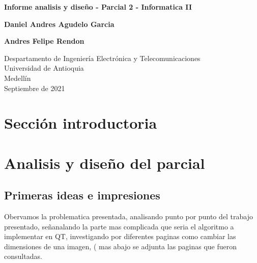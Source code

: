 \documentclass{article}
\begin{document}
\begin{titlepage}
    \begin{center}
        \vspace*{1cm}
            
        \Huge
        \textbf{Informe analisis y diseño - Parcial 2 - Informatica II}
            
        \vspace{0.5cm}
        \LARGE
            
        \vspace{1.5cm}
            
        \textbf{Daniel Andres Agudelo Garcia     }
        \vspace{1cm}
        
        \textbf{Andres Felipe Rendon}
        
            
        \vfill
            
        \vspace{0.8cm}
            
        \Large
        Despartamento de Ingeniería Electrónica y Telecomunicaciones\\
        Universidad de Antioquia\\
        Medellín\\
        Septiembre de 2021
            
    \end{center}
\end{titlepage}

\tableofcontents

\vspace{13cm}

\section{Sección introductoria}



\vspace{14cm}

\section{Analisis y diseño del parcial} \label{contenido}
\subsection{Primeras ideas e impresiones}
Obervamos la problematica presentada, analisando punto por punto del trabajo presentado, señanalando la parte mas complicada que seria el algoritmo a implementar en QT, investigando por diferentes paginas como cambiar las dimensiones de una imagen, ( mas abajo se adjunta las paginas que fueron consultadas. 
\end{document}
